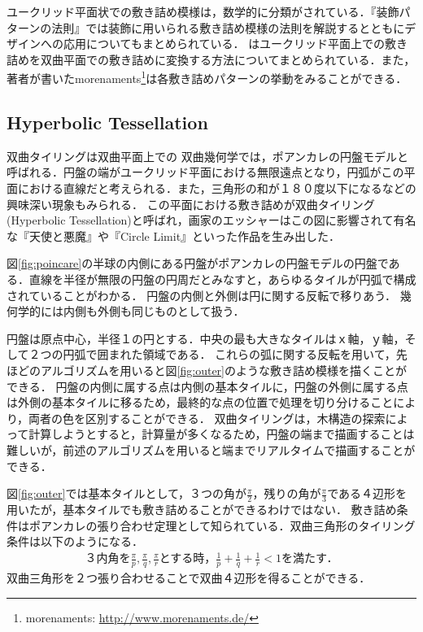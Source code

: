 ユークリッド平面状での敷き詰め模様は，数学的に分類がされている．『装飾パターンの法則』\cite{tessellationDesign}では装飾に用いられる敷き詰め模様の法則を解説するとともにデザインへの応用についてもまとめられている．
\cite{hyperbolization}はユークリッド平面上での敷き詰めを双曲平面での敷き詰めに変換する方法についてまとめられている．また，著者が書いたmorenaments\footnote{morenaments: \url{http://www.morenaments.de/}}は各敷き詰めパターンの挙動をみることができる．

\subsection{Hyperbolic Tessellation}
双曲タイリングは双曲平面上での
双曲幾何学では，ポアンカレの円盤モデルと呼ばれる．円盤の端がユークリッド平面における無限遠点となり，円弧がこの平面における直線だと考えられる．また，三角形の和が１８０度以下になるなどの興味深い現象もみられる．
この平面における敷き詰めが双曲タイリング(Hyperbolic Tessellation)と呼ばれ，画家のエッシャーはこの図に影響されて有名な『天使と悪魔』や『Circle Limit』といった作品を生み出した．

図\ref{fig:poincare}の半球の内側にある円盤がポアンカレの円盤モデルの円盤である．直線を半径が無限の円盤の円周だとみなすと，あらゆるタイルが円弧で構成されていることがわかる．
円盤の内側と外側は円に関する反転で移りあう．
幾何学的には内側も外側も同じものとして扱う．

円盤は原点中心，半径１の円とする．中央の最も大きなタイルはｘ軸，ｙ軸，そして２つの円弧で囲まれた領域である．
これらの弧に関する反転を用いて，先ほどのアルゴリズムを用いると図\ref{fig:outer}のような敷き詰め模様を描くことができる．
円盤の内側に属する点は内側の基本タイルに，円盤の外側に属する点は外側の基本タイルに移るため，最終的な点の位置で処理を切り分けることにより，両者の色を区別することができる．
双曲タイリングは，木構造の探索によって計算しようとすると，計算量が多くなるため，円盤の端まで描画することは難しいが，前述のアルゴリズムを用いると端までリアルタイムで描画することができる．

図\ref{fig:outer}では基本タイルとして，３つの角が$\frac{\pi}{2}$，残りの角が$\frac{\pi}{3}$である４辺形を用いたが，基本タイルでも敷き詰めることができるわけではない．
敷き詰め条件はポアンカレの張り合わせ定理として知られている．双曲三角形のタイリング条件は以下のようになる．
\begin{eqnarray*}
\text{３内角を}\frac{\pi}{p},\frac{\pi}{q},\frac{\pi}{r}\text{とする時，}
 \frac{1}{p} + \frac{1}{q} + \frac{1}{r} < 1 \text{を満たす．}
\end{eqnarray*}
双曲三角形を２つ張り合わせることで双曲４辺形を得ることができる．


